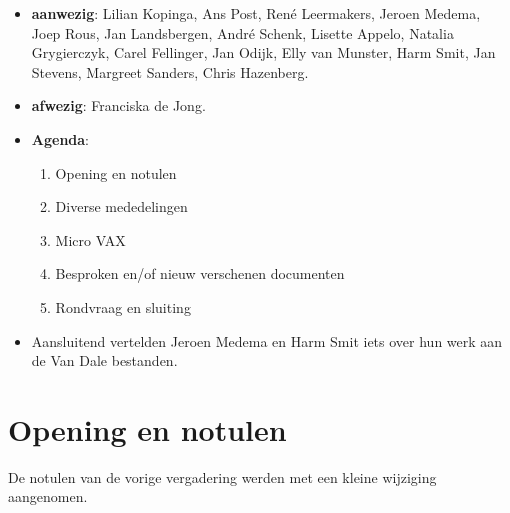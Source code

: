 
   \RosDate{\today}
   \RosSupersedes{-}
   \MakeRosTitle
\begin{itemize}
  \item {\bf aanwezig}: Lilian Kopinga, Ans Post, Ren\'{e} Leermakers, 
             Jeroen Medema, Joep Rous, Jan Landsbergen, Andr\'{e} Schenk, 
             Lisette Appelo, Natalia Grygierczyk, Carel Fellinger, Jan Odijk, 
             Elly van Munster, Harm Smit, Jan Stevens, Margreet Sanders,
             Chris Hazenberg.
  \item {\bf afwezig}: Franciska de Jong.
  \item {\bf Agenda}:
    \begin{enumerate}
       \item Opening en notulen
       \item Diverse mededelingen
       \item Micro VAX
       \item Besproken en/of nieuw verschenen documenten
       \item Rondvraag en sluiting
    \end{enumerate}
  \item Aansluitend vertelden Jeroen Medema en Harm Smit iets over hun werk aan
        de Van Dale bestanden.
\end{itemize}
\section {Opening en notulen}
De notulen van de vorige vergadering werden met een kleine wijziging aangenomen.
